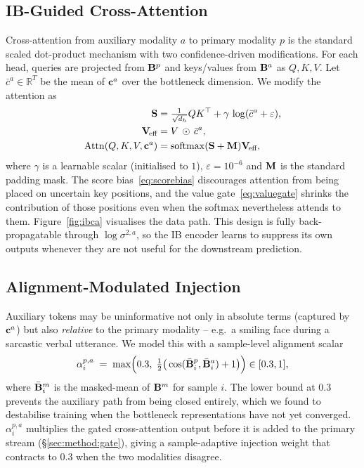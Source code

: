 \subsection{IB-Guided Cross-Attention}
\label{sec:method:ibca}

Cross-attention from auxiliary modality $a$ to primary modality $p$ is
the standard scaled dot-product mechanism with two confidence-driven
modifications.
For each head, queries are projected from $\mathbf{B}^{p}$ and keys/values from
$\mathbf{B}^{a}$ as $Q,K,V$.
Let $\bar{c}^{a}\in\mathbb{R}^{T}$ be the mean of $\mathbf{c}^{a}$ over the
bottleneck dimension.
We modify the attention as
\begin{align}
  \mathbf{S} &= \tfrac{1}{\sqrt{d_{h}}}QK^{\top} + \gamma\,\log(\bar{c}^{a}+\varepsilon),
  \label{eq:scorebias}\\
  \mathbf{V}_{\!\text{eff}} &= V\,\odot\,\bar{c}^{a},
  \label{eq:valuegate}\\
  \mathrm{Attn}(Q,K,V,\mathbf{c}^{a}) &= \mathrm{softmax}(\mathbf{S}+\mathbf{M})\mathbf{V}_{\!\text{eff}},
\end{align}
where $\gamma$ is a learnable scalar (initialised to $1$),
$\varepsilon\!=\!10^{-6}$ and $\mathbf{M}$ is the standard padding mask.
The score bias~\eqref{eq:scorebias} discourages attention from being
placed on uncertain key positions, and the value gate~\eqref{eq:valuegate}
shrinks the contribution of those positions even when the softmax
nevertheless attends to them.
Figure~\ref{fig:ibca} visualises the data path.
This design is fully back-propagatable through $\log\sigma^{2,a}$, so the
IB encoder learns to suppress its own outputs whenever they are not
useful for the downstream prediction.



\subsection{Alignment-Modulated Injection}
\label{sec:method:align}

Auxiliary tokens may be uninformative not only in absolute terms
(captured by $\mathbf{c}^{a}$) but also \emph{relative} to the primary
modality -- e.g.\ a smiling face during a sarcastic verbal utterance.
We model this with a sample-level alignment scalar
\begin{equation}
  \alpha^{p,a}_{i} \;=\; \max\!\Big(0.3,\;\tfrac{1}{2}\big(\cos(\bar{\mathbf{B}}^{p}_{i},\bar{\mathbf{B}}^{a}_{i})+1\big)\Big)\in[0.3,1],
\end{equation}
where $\bar{\mathbf{B}}^{m}_{i}$ is the masked-mean of $\mathbf{B}^{m}$ for sample
$i$.
The lower bound at $0.3$ prevents the auxiliary path from being closed
entirely, which we found to destabilise training when the bottleneck
representations have not yet converged.
$\alpha^{p,a}_{i}$ multiplies the gated cross-attention output before it
is added to the primary stream (\S\ref{sec:method:gate}), giving a
sample-adaptive injection weight that contracts to $0.3$ when the two
modalities disagree.

